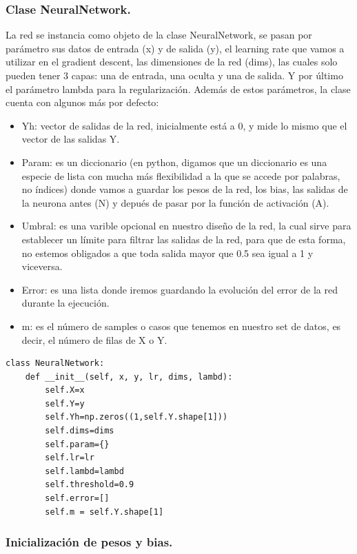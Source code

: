 \documentclass[a4paper,10pt]{article}
\begin{document}
\subsubsection{Clase NeuralNetwork.}

La red se instancia como objeto de la clase NeuralNetwork, se pasan por parámetro sus datos de entrada (x) y de salida (y), el learning rate que vamos a utilizar en el gradient descent, las dimensiones de la red (dims), las cuales solo pueden tener 3 capas: una de entrada, una oculta y una de salida. Y por último el parámetro lambda para la regularización. Además de estos parámetros, la clase cuenta con algunos más por defecto:
\begin{itemize}
    \item Yh: vector de salidas de la red, inicialmente está a 0, y mide lo mismo que el vector de las salidas Y.
    \item Param: es un diccionario (en python, digamos que un diccionario es una especie de lista con mucha más flexibilidad a la que se accede por palabras, no índices) donde vamos a guardar los pesos de la red, los bias, las salidas de la neurona antes (N) y depués de pasar por la función de activación (A).
    \item Umbral: es una varible opcional en nuestro diseño de la red, la cual sirve para establecer un límite para filtrar las salidas de la red, para que de esta forma, no estemos obligados a que toda salida mayor que 0.5 sea igual a 1 y viceversa.
    \item Error: es una lista donde iremos guardando la evolución del error de la red durante la ejecución.
    \item m: es el número de samples o casos que tenemos en nuestro set de datos, es decir, el número de filas de X o Y.
\end{itemize}
\begin{lstlisting}
class NeuralNetwork:
    def __init__(self, x, y, lr, dims, lambd):
        self.X=x
        self.Y=y
        self.Yh=np.zeros((1,self.Y.shape[1]))
        self.dims=dims
        self.param={}
        self.lr=lr
        self.lambd=lambd
        self.threshold=0.9
        self.error=[]
        self.m = self.Y.shape[1]
\end{lstlisting}
\subsubsection{Inicialización de pesos y bias.}
\end{document}
